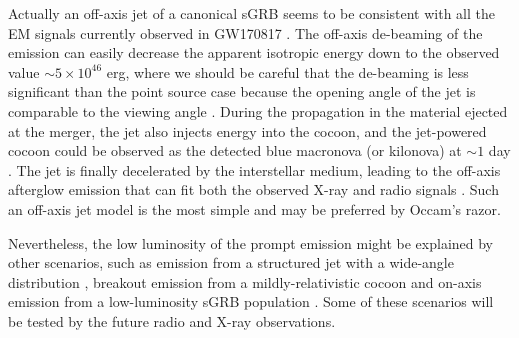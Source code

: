 \documentclass{emulateapj}
\begin{document}
Actually an off-axis jet of a canonical sGRB
seems to be consistent with all the EM signals currently observed in GW170817 
\citep{2017ApJ...848L..13A, 2017arXiv171005905I, 2017ApJ...850L..24G}.
The off-axis de-beaming of the emission can easily decrease the apparent isotropic energy 
down to the observed value $\sim 5 \times 10^{46}$ erg,
where we should be careful that the de-beaming is less significant than the point source case because
the opening angle of the jet is comparable to the viewing angle
\citep{2017arXiv171005905I}.
During the propagation in the material ejected at the merger,
the jet also injects energy into the cocoon, 
and the jet-powered cocoon could be observed as 
the detected blue macronova (or kilonova) at $\sim 1$ day
\citep{2017ApJ...848L..12A, 2017PASJ...69..102T, 2017PASJ...69..101U, 2018PASJ..tmp...22T, 2017Natur.551...75S, 
2017Natur.551...64A, 2017Natur.551...80K, 2017Sci...358.1570D, 2017Sci...358.1574S, 2017Sci...358.1559K, 2017Sci...358.1583K, 2017Sci...358.1556C, 2017Natur.551...67P, 2017ApJ...848L..17C, 2017ApJ...848L..18N, 2017ApJ...848L..26S, 2017ApJ...848L..16S, 2017ApJ...850L...1L, 2017SciBu..62.1433H, 2017ApJ...848L..29D, 2017PASA...34...69A, 2017NatAs...1..791C, 2017ApJ...848L..32M, 2017ApJ...848L..24V, 2018MNRAS.474L..71B, 2018arXiv180207732M}.
The jet is finally decelerated by the interstellar medium,
leading to the off-axis afterglow emission 
that can fit both the observed X-ray and radio signals
\citep{2017Natur.551...71T, 2017Sci...358.1565E, 2017Sci...358.1579H, 2017arXiv171008514F, 2017ApJ...848L..20M, 2017ApJ...848L..21A, 2017ApJ...848L..25H, 2017ApJ...850L..21K}.
Such an off-axis jet model is the most simple and may be preferred by Occam's razor.

Nevertheless, the low luminosity of the prompt emission might be
explained by other scenarios, such as 
emission from a structured jet with a wide-angle distribution \citep{2016ApJ...829..112L, 2017arXiv170807008J, 2017arXiv171006421G, 2017ApJ...850L..41X, 2018NatCo...9..447Z, 2017arXiv171005823B},
breakout emission from a mildly-relativistic cocoon
\citep{2017arXiv171005896G, 2018ApJ...852L..30P, 2018ApJ...855..103P}
and on-axis emission from a low-luminosity sGRB population
\citep{2017ApJ...848L..34M, 2017arXiv171005869H, 2018ApJ...853L..10Y, 2018ApJ...852L...1Z, 2017arXiv171005857L}.
Some of these scenarios will be tested by the future radio and X-ray observations.
\end{document}
